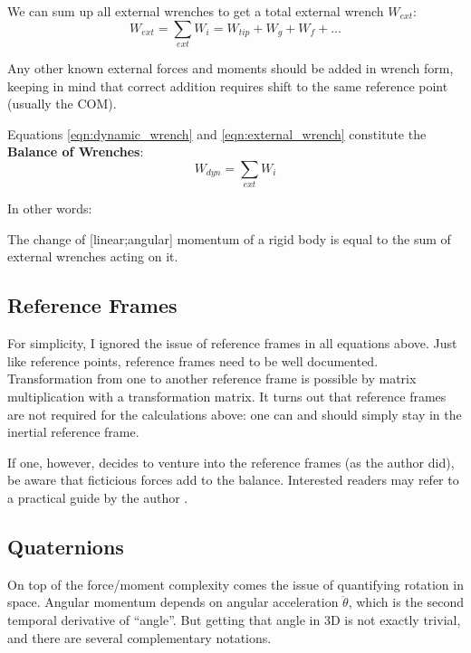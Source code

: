 We can sum up all external wrenches to get a total external wrench \(W_{ext}\):
\begin{equation}\label{eqn:external_wrench}
W_{ext} = \sum\limits_{ext} W_{i} = W_{tip} +W_{g}+W_{f}+\ldots
\end{equation}

Any other known external forces and moments should be added in wrench form, keeping in mind that correct addition requires shift to the same reference point (usually the COM).


Equations \eqref{eqn:dynamic_wrench} and \eqref{eqn:external_wrench} constitute the \textbf{Balance of Wrenches}:
\begin{equation}\label{eqn:balance_of_wrenches}
W_{dyn} = \sum\limits_{ext} W_{i}
\end{equation}

In other words:
\begin{center}
The change of [linear;angular] momentum of a rigid body is equal to the sum of external wrenches acting on it.
\end{center}


\subsection{Reference Frames}
\label{sec:orge0b067d}

For simplicity, I ignored the issue of reference frames in all equations above.
Just like reference points, reference frames need to be well documented.
Transformation from one to another reference frame is possible by matrix multiplication with a transformation matrix.
It turns out that reference frames are not required for the calculations above: one can and should simply stay in the inertial reference frame.

If one, however, decides to venture into the reference frames (as the author did), be aware that ficticious forces add to the balance.
Interested readers may refer to a practical guide by the author \citep{Mielke2020wrenches}.


\subsection{Quaternions}
\label{sec:org129a602}
On top of the force/moment complexity comes the issue of quantifying rotation in space.
Angular momentum depends on angular acceleration \(\ddot\theta\), which is the second temporal derivative of ``angle''.
But getting that angle in 3D is not exactly trivial, and there are several complementary notations.


